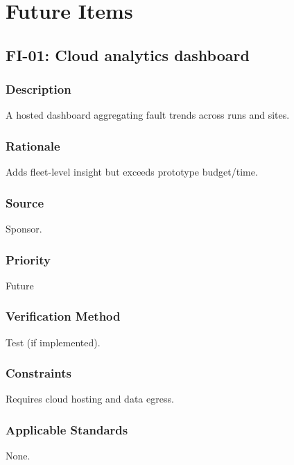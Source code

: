 \documentclass[11pt,letterpaper]{article}
\newcommand{\req}[7]{%
  \subsubsection*{Description} #1
  \subsubsection*{Rationale} #2
  \subsubsection*{Source} #3
  \subsubsection*{Priority} #4
  \subsubsection*{Verification Method} #5
  \subsubsection*{Constraints} #6
  \subsubsection*{Applicable Standards} #7
}
\begin{document}
\section{Future Items}
\subsection{FI-01: Cloud analytics dashboard}
\req{A hosted dashboard aggregating fault trends across runs and sites.}
{Adds fleet-level insight but exceeds prototype budget/time.}
{Sponsor.}{Future}{Test (if implemented).}{Requires cloud hosting and data egress.}{None.}


{}
\end{document}
